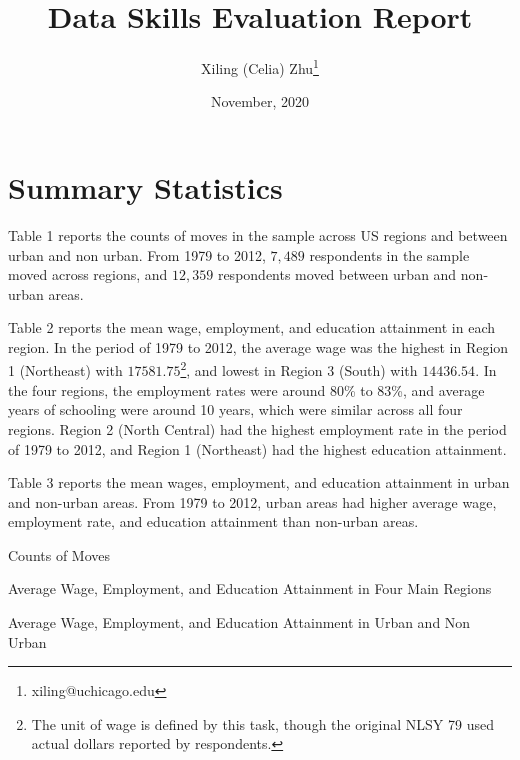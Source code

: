 \documentclass[12pt]{article}
\begin{document}
\title{Data Skills Evaluation Report}
\author{Xiling (Celia) Zhu\thanks{xiling@uchicago.edu}}
\date{November, 2020}
\maketitle

\setcounter{page}{1}

\doublespacing


\section{Summary Statistics} 
Table 1 reports the counts of moves in the sample across US regions and between urban and non urban. From 1979 to 2012, $7,489$ respondents in the sample moved across regions, and $12,359$ respondents moved between urban and non-urban areas. 

Table 2 reports the mean wage, employment, and education attainment in each region. In the period of 1979 to 2012, the average wage was the highest in Region 1 (Northeast) with $17581.75$\footnote{The unit of wage is defined by this task, though the original NLSY 79 used actual dollars reported by respondents.}, and lowest in Region 3 (South) with $14436.54$. In the four regions, the employment rates were around 80\% to 83\%, and average years of schooling were around 10 years, which were similar across all four regions. Region 2 (North Central) had the highest employment rate in the period of 1979 to 2012, and Region 1 (Northeast) had the highest education attainment. 

Table 3 reports the mean wages, employment, and education attainment in urban and non-urban areas. From 1979 to 2012, urban areas had higher average wage, employment rate, and education attainment than non-urban areas. 

\begin{table}[H]
\caption{Counts of Moves}

\end{table}

\begin{table}[H]
\caption{Average Wage, Employment, and Education Attainment in Four Main Regions}

\end{table}

\begin{table}[H]
\caption{Average Wage, Employment, and Education Attainment in Urban and Non Urban}

\end{table}
\end{document}
